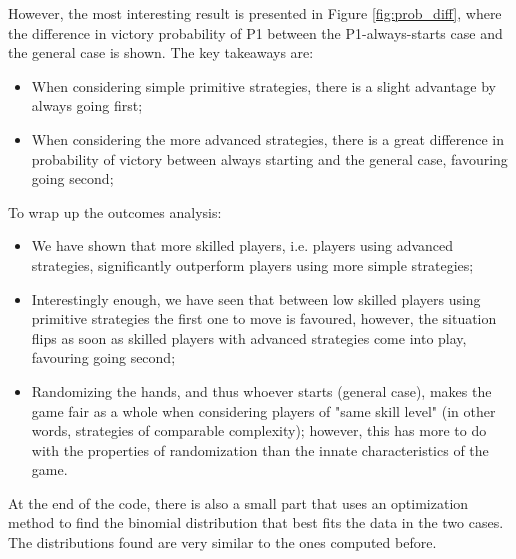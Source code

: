 However, the most interesting result is presented in Figure \ref{fig:prob_diff}, where the difference in victory probability of P1 between the P1-always-starts case and the general case is shown. The key takeaways are:
\begin{itemize}
	\item When considering simple primitive strategies, there is a slight advantage by always going first;
	\item When considering the more advanced strategies, there is a great difference in probability of victory between always starting and the general case, favouring going second;
\end{itemize}

To wrap up the outcomes analysis:
\begin{itemize}
	\item We have shown that more skilled players, i.e. players using advanced strategies, significantly outperform players using more simple strategies;
	\item Interestingly enough, we have seen that between low skilled players using primitive strategies the first one to move is favoured, however, the situation flips as soon as skilled players with advanced strategies come into play, favouring going second;
	\item Randomizing the hands, and thus whoever starts (general case), makes the game fair as a whole when considering players of "same skill level" (in other words, strategies of comparable complexity); however, this has more to do with the properties of randomization than the innate characteristics of the game.
\end{itemize}

At the end of the code, there is also a small part that uses an optimization method to find the binomial distribution that best fits the data in the two cases. The distributions found are very similar to the ones computed before.